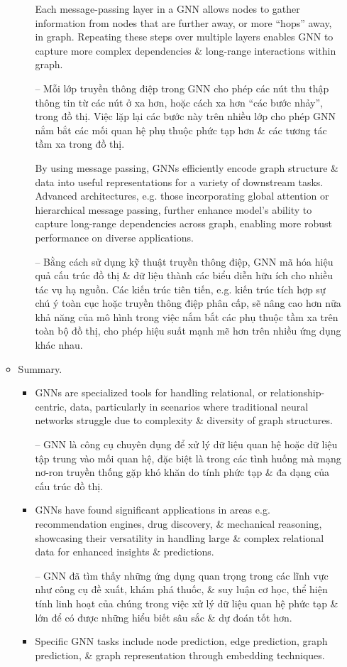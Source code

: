 \documentclass{article}
\begin{document}
\begin{itemize}
\begin{itemize}
\begin{itemize}
            Each message-passing layer in a GNN allows nodes to gather information from nodes that are further away, or more ``hops'' away, in graph. Repeating these steps over multiple layers enables GNN to capture more complex dependencies \& long-range interactions within graph.

            -- Mỗi lớp truyền thông điệp trong GNN cho phép các nút thu thập thông tin từ các nút ở xa hơn, hoặc cách xa hơn ``các bước nhảy'', trong đồ thị. Việc lặp lại các bước này trên nhiều lớp cho phép GNN nắm bắt các mối quan hệ phụ thuộc phức tạp hơn \& các tương tác tầm xa trong đồ thị.

            By using message passing, GNNs efficiently encode graph structure \& data into useful representations for a variety of downstream tasks. Advanced architectures, e.g. those incorporating global attention or hierarchical message passing, further enhance model's ability to capture long-range dependencies across graph, enabling more robust performance on diverse applications.

            -- Bằng cách sử dụng kỹ thuật truyền thông điệp, GNN mã hóa hiệu quả cấu trúc đồ thị \& dữ liệu thành các biểu diễn hữu ích cho nhiều tác vụ hạ nguồn. Các kiến trúc tiên tiến, e.g. kiến trúc tích hợp sự chú ý toàn cục hoặc truyền thông điệp phân cấp, sẽ nâng cao hơn nữa khả năng của mô hình trong việc nắm bắt các phụ thuộc tầm xa trên toàn bộ đồ thị, cho phép hiệu suất mạnh mẽ hơn trên nhiều ứng dụng khác nhau.
        \end{itemize}
        \item {\sf Summary.}
        \begin{itemize}
            \item GNNs are specialized tools for handling relational, or relationship-centric, data, particularly in scenarios where traditional neural networks struggle due to complexity \& diversity of graph structures.

            -- GNN là công cụ chuyên dụng để xử lý dữ liệu quan hệ hoặc dữ liệu tập trung vào mối quan hệ, đặc biệt là trong các tình huống mà mạng nơ-ron truyền thống gặp khó khăn do tính phức tạp \& đa dạng của cấu trúc đồ thị.
            \item GNNs have found significant applications in areas e.g. recommendation engines, drug discovery, \& mechanical reasoning, showcasing their versatility in handling large \& complex relational data for enhanced insights \& predictions.

            -- GNN đã tìm thấy những ứng dụng quan trọng trong các lĩnh vực như công cụ đề xuất, khám phá thuốc, \& suy luận cơ học, thể hiện tính linh hoạt của chúng trong việc xử lý dữ liệu quan hệ phức tạp \& lớn để có được những hiểu biết sâu sắc \& dự đoán tốt hơn.
            \item Specific GNN tasks include node prediction, edge prediction, graph prediction, \& graph representation through embedding techniques.


\end{itemize}
\end{itemize}
\end{itemize}
\end{document}
